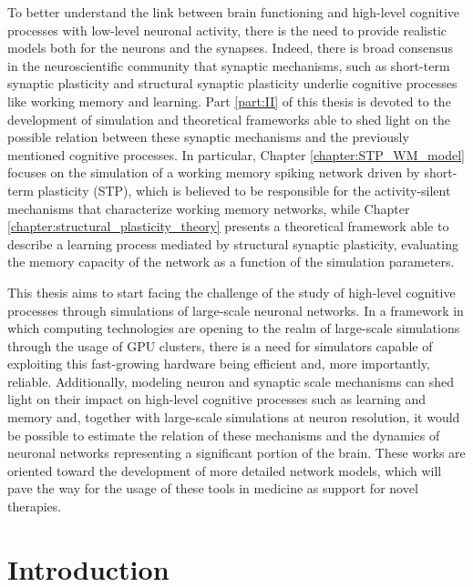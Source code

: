 \documentclass[a4paper, 12pt, twoside, openright]{book}
\begin{document}
To better understand the link between brain functioning and high-level cognitive processes with low-level neuronal activity, there is the need to provide realistic models both for the neurons and the synapses. Indeed, there is broad consensus in the neuroscientific community that synaptic mechanisms, such as short-term synaptic plasticity and structural synaptic plasticity underlie cognitive processes like working memory and learning. Part \ref{part:II} of this thesis is devoted to the development of simulation and theoretical frameworks able to shed light on the possible relation between these synaptic mechanisms and the previously mentioned cognitive processes. In particular, Chapter \ref{chapter:STP_WM_model} focuses on the simulation of a working memory spiking network driven by short-term plasticity (STP), which is believed to be responsible for the activity-silent mechanisms that characterize working memory networks, while Chapter \ref{chapter:structural_plasticity_theory} presents a theoretical framework able to describe a learning process mediated by structural synaptic plasticity, evaluating the memory capacity of the network as a function of the simulation parameters.


This thesis aims to start facing the challenge of the study of high-level cognitive processes through simulations of large-scale neuronal networks. In a framework in which computing technologies are opening to the realm of large-scale simulations through the usage of GPU clusters, there is a need for simulators capable of exploiting this fast-growing hardware being efficient and, more importantly, reliable. Additionally, modeling neuron and synaptic scale mechanisms can shed light on their impact on high-level cognitive processes such as learning and memory and, together with large-scale simulations at neuron resolution, it would be possible to estimate the relation of these mechanisms and the dynamics of neuronal networks representing a significant portion of the brain. These works are oriented toward the development of more detailed network models, which will pave the way for the usage of these tools in medicine as support for novel therapies.


\part{Introduction}
\label{part:intro}

\fancyfoot[C]{\thepage}
\end{document}
